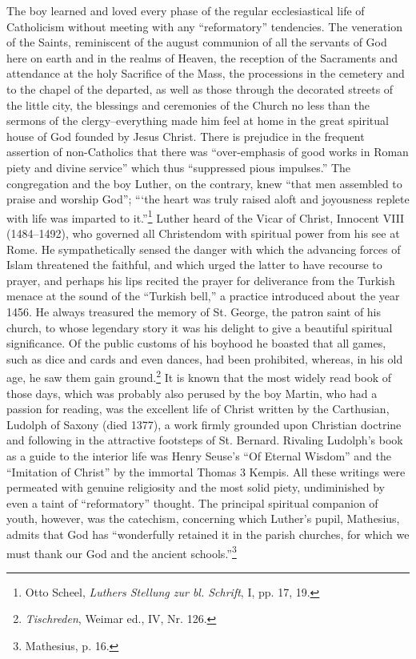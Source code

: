 The boy learned and loved every phase of the regular ecclesiastical
life of Catholicism without meeting with any “reformatory” tendencies.
The veneration of the Saints, reminiscent of the august communion of all the servants
of God here on earth and in the realms of Heaven, the reception of
the Sacraments and attendance at the
holy Sacrifice of the Mass, the processions in the cemetery and to
the chapel of the departed, as well as those through the decorated
streets of the little city, the blessings and ceremonies of the Church
no less than the sermons of the clergy--everything made him feel
at home in the great spiritual house of God founded by Jesus Christ.
There is prejudice in the frequent assertion of non-Catholics that
there was “over-emphasis of good works in Roman piety and divine
service” which thus “suppressed pious impulses.” The congregation
and the boy Luther, on the contrary, knew “that men assembled
to praise and worship God”; “‘the heart was truly raised aloft and
joyousness replete with life was imparted to it.”\footnote{Otto Scheel, \textit{Luthers Stellung zur bl. Schrift}, I, pp. 17, 19.}
Luther heard of the Vicar of Christ, Innocent VIII (1484--1492), who governed
all Christendom with spiritual power from his see at Rome. He
sympathetically sensed the danger with which the advancing forces
of Islam threatened the faithful, and which urged the latter to have
recourse to prayer, and perhaps his lips recited the prayer for deliverance
from the Turkish menace at the sound of the “Turkish bell,”
a practice introduced about the year 1456. He always treasured
the memory of St. George, the patron saint of his church, to whose
legendary story it was his delight to give a beautiful spiritual
significance. Of the public customs of his boyhood he boasted
that all games, such as dice and cards and even dances, had been
prohibited, whereas, in his old age, he saw them gain ground.\footnote{\textit{Tischreden}, Weimar ed., IV, Nr. 126.}
It
is known that the most widely read book of those days, which was
probably also perused by the boy Martin, who had a passion for
reading, was the excellent life of Christ written by the Carthusian,
Ludolph of Saxony (died 1377), a work firmly grounded upon
Christian doctrine and following in the attractive footsteps of St.
Bernard. Rivaling Ludolph’s book as a guide to the interior life
was Henry Seuse’s “Of Eternal Wisdom” and the “Imitation of
Christ” by the immortal Thomas 3 Kempis. All these writings were
permeated with genuine religiosity and the most solid piety, undiminished by even a taint of “reformatory” thought. The principal
spiritual companion of youth, however, was the catechism, concerning which Luther’s pupil, Mathesius, admits that God has “wonderfully retained it in the parish churches, for which we must thank
our God and the ancient schools.”\footnote{Mathesius, p. 16.}

